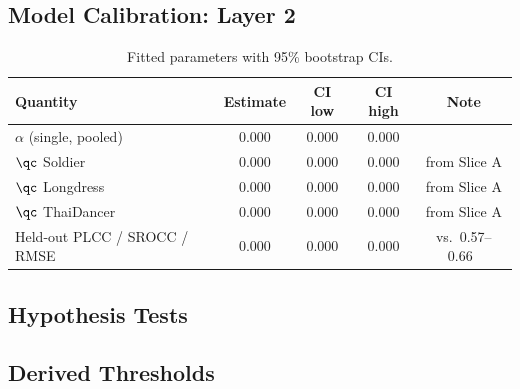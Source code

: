 \subsection{Model Calibration: Layer 2}
\begin{table}[t]
  \caption{Fitted \crystal parameters with 95\% bootstrap CIs. }
  \label{tab:params}
  \centering
  \small
  \begin{tabular}{@{}lS[table-format=1.3]S[table-format=1.3]S[table-format=1.3]S[table-format=1.3]@{}}
    \toprule
    Quantity & {Estimate} & {CI low} & {CI high} & {Note} \\
    \midrule
    $\alpha$ (single, pooled)         & 0.000 & 0.000 & 0.000 & {} \\
    $\qc$ Soldier                     & 0.000 & 0.000 & 0.000 & {from Slice A} \\
    $\qc$ Longdress                   & 0.000 & 0.000 & 0.000 & {from Slice A} \\
    $\qc$ ThaiDancer                  & 0.000 & 0.000 & 0.000 & {from Slice A} \\
    \midrule
    Held-out PLCC / SROCC / RMSE      & 0.000 & 0.000 & 0.000 & {vs.\ 0.57--0.66~\cite{udora2025thesis}} \\
    \bottomrule
  \end{tabular}
\end{table}

\subsection{Hypothesis Tests}

\subsection{Derived Thresholds}
